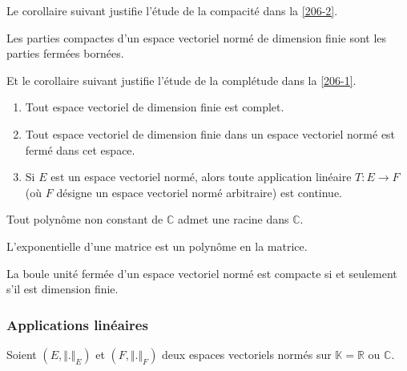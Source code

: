   Le corollaire suivant justifie l'étude de la compacité dans la \cref{206-2}.

  \begin{corollary}
    Les parties compactes d'un espace vectoriel normé de dimension finie sont les parties fermées bornées.
  \end{corollary}

  Et le corollaire suivant justifie l'étude de la complétude dans la \cref{206-1}.

  \begin{corollary}
    \begin{enumerate}[label=(\roman*)]
      \item Tout espace vectoriel de dimension finie est complet.
      \item Tout espace vectoriel de dimension finie dans un espace vectoriel normé est fermé dans cet espace.
      \item Si $E$ est un espace vectoriel normé, alors toute application linéaire $T : E \rightarrow F$ (où $F$ désigne un espace vectoriel normé arbitraire) est continue.
    \end{enumerate}
  \end{corollary}


  \begin{application}
    Tout polynôme non constant de $\mathbb{C}$ admet une racine dans $\mathbb{C}$.
  \end{application}


  \begin{application}
    L'exponentielle d'une matrice est un polynôme en la matrice.
  \end{application}


  \begin{theorem}[Riesz]
    La boule unité fermée d'un espace vectoriel normé est compacte si et seulement s'il est dimension finie.
  \end{theorem}

  \subsubsection{Applications linéaires}


  Soient $(E, \Vert . \Vert_E)$ et $(F, \Vert . \Vert_F)$ deux espaces vectoriels normés sur $\mathbb{K} = \mathbb{R}$ ou $\mathbb{C}$.

